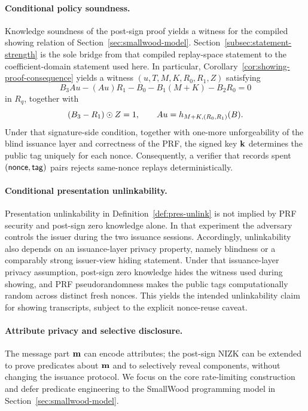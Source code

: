 \paragraph{Conditional policy soundness.}
Knowledge soundness of the post-sign proof yields a witness for the compiled showing relation of
Section~\ref{sec:smallwood-model}. Section~\ref{subsec:statement-strength} is the sole bridge from that compiled
replay-space statement to the coefficient-domain statement used here. In particular,
Corollary~\ref{cor:showing-proof-consequence} yields a witness \((u,T,M,K,R_0,R_1,Z)\) satisfying
\[
B_3Au-(Au)R_1-B_0-B_1(M+K)-B_2R_0=0
\]
in \(R_q\), together with
\[
(B_3-R_1)\odot Z = 1,
\qquad
Au = h_{M+K,(R_0,R_1)}(B).
\]
Under that signature-side condition, together with one-more unforgeability of the blind issuance layer and correctness
of the PRF, the signed key \(\mathbf{k}\) determines the public tag uniquely for each nonce. Consequently, a verifier that
records spent \((\mathsf{nonce},\mathsf{tag})\) pairs rejects same-nonce replays deterministically.

\paragraph{Conditional presentation unlinkability.}
Presentation unlinkability in Definition~\ref{def:pres-unlink} is not implied by PRF security and post-sign zero
knowledge alone. In that experiment the adversary controls the issuer during the two issuance sessions. Accordingly,
unlinkability also depends on an issuance-layer privacy property, namely blindness or a comparably strong issuer-view
hiding statement. Under that issuance-layer privacy assumption, post-sign zero knowledge hides the witness used during
showing, and PRF pseudorandomness makes the public tags computationally random across distinct fresh nonces. This yields
the intended unlinkability claim for showing transcripts, subject to the explicit nonce-reuse caveat.

\paragraph{Attribute privacy and selective disclosure.}
The message part \(\mathbf{m}\) can encode attributes; the post-sign NIZK can be extended to prove predicates about \(\mathbf{m}\) and
to selectively reveal components, without changing the issuance protocol. We focus on the core rate-limiting
construction and defer predicate engineering to the SmallWood programming model in Section~\ref{sec:smallwood-model}.

